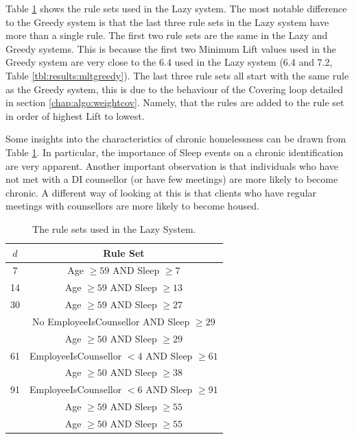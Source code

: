 Table \ref{tbl:results:lazysets} shows the rule sets used in the Lazy system. The most notable difference to the Greedy system is that the last three rule sets in the Lazy system have more than a single rule. The first two rule sets are the same in the Lazy and Greedy systems. This is because the first two Minimum Lift values used in the Greedy system are very close to the 6.4 used in the Lazy system (6.4 and 7.2, Table \ref{tbl:results:mltgreedy}). The last three rule sets all start with the same rule as the Greedy system, this is due to the behaviour of the Covering loop detailed in section \ref{chap:algo:weightcov}. Namely, that the rules are added to the rule set in order of highest Lift to lowest.

Some insights into the characteristics of chronic homelessness can be drawn from Table \ref{tbl:results:lazysets}. In particular, the importance of Sleep events on a chronic identification are very apparent. Another important observation is that individuals who have not met with a DI counsellor (or have few meetings) are more likely to become chronic. A different way of looking at this is that clients who have regular meetings with counsellors are more likely to become housed.

\begin{table}[h]
	\centering

	\begin{tabular}{cc}
	\toprule
	$d$ & Rule Set \\
	\midrule
	7 	& Age $\geq 59$ AND Sleep $\geq 7$ \\
	\midrule
	14	& Age $\geq 59$ AND Sleep $\geq 13$ \\
	\midrule
	30	& Age $\geq 59$ AND Sleep $\geq 27$ \\ 
			& No EmployeeIsCounsellor AND Sleep $\geq 29$ \\
			& Age $\geq 50$ AND Sleep $\geq 29$ \\
	\midrule
	61	& EmployeeIsCounsellor $< 4$ AND Sleep $\geq 61$ \\
			& Age $\geq 50$ AND Sleep $\geq 38$ \\
	\midrule
	91	& EmployeeIsCounsellor $< 6$ AND Sleep $\geq 91$ \\
			& Age $\geq 59$ AND Sleep $\geq 55$ \\
			& Age $\geq 50$ AND Sleep $\geq 55$ \\
	\bottomrule
	\end{tabular}

	\caption{The rule sets used in the Lazy System.}
	\label{tbl:results:lazysets}
\end{table}


